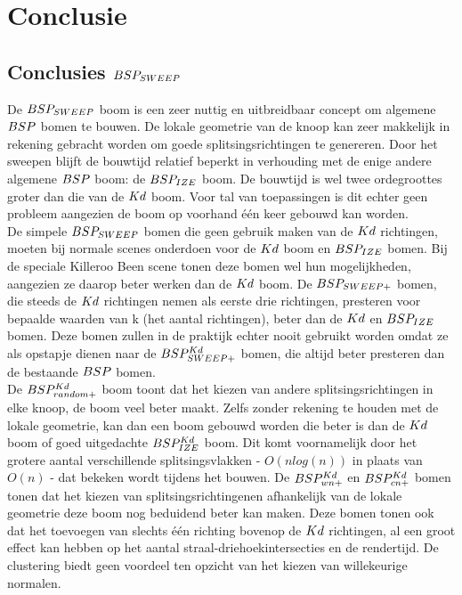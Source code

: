 \chapter{Conclusie}
\label{hoofdstuk:conclusie}

\section{Conclusies $BSP_{SWEEP}$}
De $BSP_{SWEEP}$ boom is een zeer nuttig en uitbreidbaar concept om algemene $BSP$ bomen te bouwen.
De lokale geometrie van de knoop kan zeer makkelijk in rekening gebracht worden om goede splitsingsrichtingen te genereren.
Door het sweepen blijft de bouwtijd relatief beperkt in verhouding met de enige andere algemene $BSP$ boom: de $BSP_{IZE}$ boom.
De bouwtijd is wel twee ordegroottes groter dan die van de $Kd$ boom.
Voor tal van toepassingen is dit echter geen probleem aangezien de boom op voorhand één keer gebouwd kan worden.\\

De simpele $BSP_{SWEEP}$ bomen die geen gebruik maken van de $Kd$ richtingen, moeten bij normale scenes onderdoen voor de $Kd$ boom en $BSP_{IZE}$ bomen.
Bij de speciale Killeroo Been scene tonen deze bomen wel hun mogelijkheden, aangezien ze daarop beter werken dan de $Kd$ boom.
De $BSP_{SWEEP+}$ bomen, die steeds de $Kd$ richtingen nemen als eerste drie richtingen, presteren voor bepaalde waarden van k (het aantal richtingen), beter dan de $Kd$ en $BSP_{IZE}$ bomen.
Deze bomen zullen in de praktijk echter nooit gebruikt worden omdat ze als opstapje dienen naar de $BSP^{Kd}_{SWEEP+}$ bomen, die altijd beter presteren dan de bestaande $BSP$ bomen.\\

De $BSP^{Kd}_{random+}$ boom toont dat het kiezen van andere splitsingsrichtingen in elke knoop, de boom veel beter maakt. 
Zelfs zonder rekening te houden met de lokale geometrie, kan dan een boom gebouwd worden die beter is dan de $Kd$ boom of goed uitgedachte $BSP^{Kd}_{IZE}$ boom. 
Dit komt voornamelijk door het grotere aantal verschillende splitsingsvlakken - $O(nlog(n))$ in plaats van $O(n)$ - dat bekeken wordt tijdens het bouwen.
De $BSP^{Kd}_{wn+}$ en $BSP^{Kd}_{cn+}$ bomen tonen dat het kiezen van splitsingsrichtingenen afhankelijk van de lokale geometrie deze boom nog beduidend beter kan maken.
Deze bomen tonen ook dat het toevoegen van slechts één richting bovenop de $Kd$ richtingen, al een groot effect kan hebben op het aantal straal-driehoekintersecties en de rendertijd.
De clustering biedt geen voordeel ten opzicht van het kiezen van willekeurige normalen.

